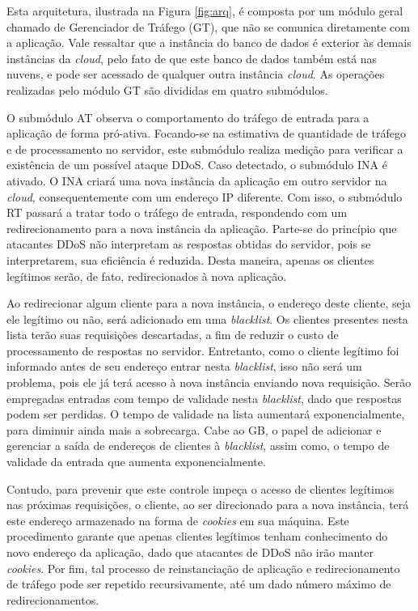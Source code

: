 Esta arquitetura, ilustrada na Figura \ref{fig:arq}, é composta por um módulo geral chamado de Gerenciador de Tráfego (GT), que não se comunica diretamente com a aplicação. Vale ressaltar que a instância do banco de dados é exterior às demais instâncias da \emph{cloud}, pelo fato de que este banco de dados também está nas nuvens, e pode ser acessado de qualquer outra instância \emph{cloud}. As operações realizadas pelo módulo GT são divididas em quatro submódulos.


O submódulo AT observa o comportamento do tráfego de entrada para a aplicação de forma pró-ativa. Focando-se na estimativa de quantidade de tráfego e de processamento no servidor, este submódulo realiza medição para verificar a existência de um possível ataque DDoS. Caso detectado, o submódulo INA é ativado. O INA criará uma nova instância da aplicação em outro servidor na \emph{cloud}, consequentemente com um endereço IP diferente.%
 Com isso, o submódulo RT passará a tratar todo o tráfego de entrada, respondendo com um redirecionamento para a nova instância da aplicação. Parte-se do princípio que atacantes DDoS não interpretam as respostas obtidas do servidor, pois se interpretarem, sua eficiência é reduzida. Desta maneira, apenas os clientes legítimos serão, de fato, redirecionados à nova aplicação.

Ao redirecionar algum cliente para a nova instância, o endereço deste cliente, seja ele legítimo ou não, será adicionado em uma \emph{blacklist}. Os clientes presentes nesta lista terão suas requisições descartadas, a fim de reduzir o custo de processamento de respostas no servidor. Entretanto, como o cliente legítimo foi informado antes de seu endereço entrar nesta \emph{blacklist}, isso não será um problema, pois ele já terá acesso à nova instância enviando nova requisição. Serão empregadas entradas com tempo de validade nesta \emph{blacklist}, dado que respostas podem ser perdidas. O tempo de validade na lista aumentará exponencialmente, para diminuir ainda mais a sobrecarga. Cabe ao GB, o papel de adicionar e gerenciar a saída de endereços de clientes à \emph{blacklist}, assim como, o tempo de validade da entrada que aumenta exponencialmente.

Contudo, para prevenir que este controle impeça o acesso de clientes legítimos nas próximas requisições, o cliente, ao ser direcionado para a nova instância, terá este endereço armazenado na forma de \emph{cookies} em sua máquina. Este procedimento garante que apenas clientes legítimos tenham conhecimento do novo endereço da aplicação, dado que atacantes de DDoS não irão manter \emph{cookies}. Por fim,  tal processo de reinstanciação de aplicação e redirecionamento de tráfego pode ser repetido recursivamente, até um dado número máximo de redirecionamentos.


